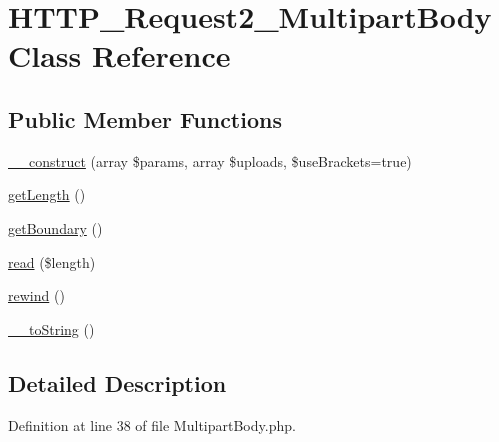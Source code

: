 \hypertarget{classHTTP__Request2__MultipartBody}{\section{H\-T\-T\-P\-\_\-\-Request2\-\_\-\-Multipart\-Body Class Reference}
\label{classHTTP__Request2__MultipartBody}
}
\subsection*{Public Member Functions}
\begin{DoxyCompactItemize}
\item 
\hyperlink{classHTTP__Request2__MultipartBody_afcc06a1975350d5bf0a66b8756cedb47}{\-\_\-\-\_\-construct} (array \$params, array \$uploads, \$use\-Brackets=true)
\item 
\hyperlink{classHTTP__Request2__MultipartBody_ad363b71daa46b8fc283bbe35c0c822c8}{get\-Length} ()
\item 
\hyperlink{classHTTP__Request2__MultipartBody_a67b4cebe7c8e77040d0c8961aa2b9aad}{get\-Boundary} ()
\item 
\hyperlink{classHTTP__Request2__MultipartBody_aa392b34f91cbaf97962b7f77ea287cad}{read} (\$length)
\item 
\hyperlink{classHTTP__Request2__MultipartBody_af603c54ddf7736f0cbfcab11f64e089b}{rewind} ()
\item 
\hyperlink{classHTTP__Request2__MultipartBody_a06b941512f51155beacac6c34cc34826}{\-\_\-\-\_\-to\-String} ()
\end{DoxyCompactItemize}


\subsection{Detailed Description}


Definition at line 38 of file Multipart\-Body.\-php.



